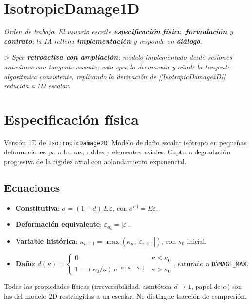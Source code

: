 \documentclass[11pt,letterpaper,oneside]{report}
\begin{document}
\newpage

\section{IsotropicDamage1D}



\textit{Orden de trabajo. El usuario escribe \textbf{especificación física}, \textbf{formulación} y \textbf{contrato}; la IA rellena \textbf{implementación} y responde en \textbf{diálogo}.}

\textit{> Spec \textbf{retroactiva con ampliación}: modelo implementado desde sesiones anteriores con tangente secante; esta spec lo documenta y añade la tangente algorítmica consistente, replicando la derivación de [[IsotropicDamage2D]] reducida a 1D escalar.}



\section{Especificación física}

Versión 1D de \texttt{IsotropicDamage2D}. Modelo de daño escalar isótropo en pequeñas deformaciones para barras, cables y elementos axiales. Captura degradación progresiva de la rigidez axial con ablandamiento exponencial.

\subsection{Ecuaciones}

\begin{itemize}
  \item \textbf{Constitutiva}: $\sigma = (1 - d)\,E\,\varepsilon$, con $\sigma^\text{eff} = E\varepsilon$.
  \item \textbf{Deformación equivalente}: $\varepsilon_\text{eq} = |\varepsilon|$.
  \item \textbf{Variable histórica}: $\kappa_{n+1} = \max(\kappa_n, |\varepsilon_{n+1}|)$, con $\kappa_0$ inicial.
  \item \textbf{Daño}: $d(\kappa) = \begin{cases}0 & \kappa \leq \kappa_0 \\ 1 - (\kappa_0/\kappa)\,e^{-\alpha(\kappa - \kappa_0)} & \kappa > \kappa_0\end{cases}$, saturado a \texttt{DAMAGE\_MAX}.
\end{itemize}

Todas las propiedades físicas (irreversibilidad, asintótica $d \to 1$, papel de $\alpha$) son las del modelo 2D restringidas a un escalar. No distingue tracción de compresión.
\end{document}
